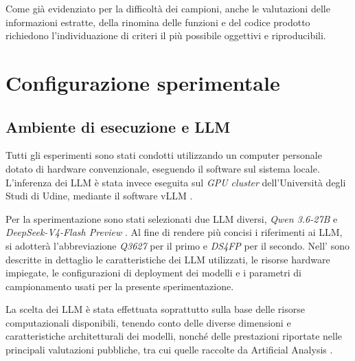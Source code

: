 

Come già evidenziato per la difficoltà dei campioni, anche le valutazioni delle informazioni estratte, della rinomina delle funzioni e del codice prodotto richiedono l'individuazione di criteri il più possibile oggettivi e riproducibili. %

\section{Configurazione sperimentale} %

\subsection{Ambiente di esecuzione e LLM} %

Tutti gli esperimenti sono stati condotti utilizzando un computer personale dotato di hardware convenzionale, eseguendo il software sul sistema locale. L'inferenza dei LLM è stata invece eseguita sul \emph{GPU cluster} dell'Università degli Studi di Udine, mediante il software vLLM \cite{vllm2026vllm}.

Per la sperimentazione sono stati selezionati due LLM diversi, \emph{Qwen 3.6-27B} \cite{alibaba2026qwen3627b} e \emph{DeepSeek-V4-Flash Preview} \cite{deepseekai2026deepseekv4}. Al fine di rendere più concisi i riferimenti ai LLM, si adotterà l'abbreviazione \emph{Q3627} per il primo e \emph{DS4FP} per il secondo. Nell' sono descritte in dettaglio le caratteristiche dei LLM utilizzati, le risorse hardware impiegate, le configurazioni di deployment dei modelli e i parametri di campionamento usati per la presente sperimentazione.

La scelta dei LLM è stata effettuata soprattutto sulla base delle risorse computazionali disponibili, tenendo conto delle diverse dimensioni e caratteristiche architetturali dei modelli, nonché delle prestazioni riportate nelle principali valutazioni pubbliche, tra cui quelle raccolte  da Artificial Analysis \cite{artificialanalysis2026aaii}.


